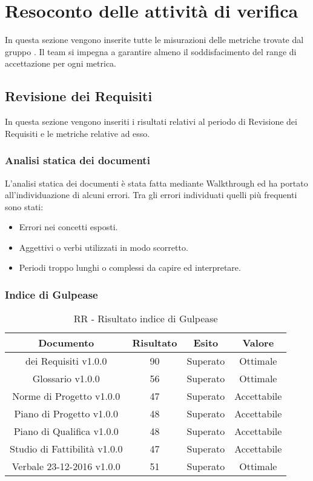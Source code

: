\section{Resoconto delle attività di verifica}

In questa sezione vengono inserite tutte le misurazioni delle metriche trovate dal gruppo \gruppo.
Il team si impegna a garantire almeno il soddisfacimento del range di accettazione per ogni metrica.


\subsection{Revisione dei Requisiti}
In questa sezione vengono inseriti i risultati relativi al periodo di Revisione dei Requisiti e le metriche relative ad esso.

\subsubsection{Analisi statica dei documenti}
L'analisi statica dei documenti è stata fatta mediante Walkthrough ed ha portato all'individuazione di alcuni errori. Tra gli errori individuati quelli più frequenti sono stati:
		\begin{itemize}
			\item Errori nei concetti esposti.
			\item Aggettivi o verbi utilizzati in modo scorretto.
			\item Periodi troppo lunghi o complessi da capire ed interpretare.
		\end{itemize}
		
\subsubsection{Indice di Gulpease}

\begin{table}[h]
	\begin{center}
		\begin{tabular}{|c|c|c|c|}
			\hline
			\textbf{Documento}	& \textbf{Risultato} & \textbf{Esito} & \textbf{Valore} \\
			\hline
		 \termine{Analisi} dei Requisiti v1.0.0 & 90 & Superato & Ottimale	\\
			\hline
			Glossario v1.0.0 & 56 & Superato & Ottimale	\\
			\hline
			Norme di Progetto v1.0.0 & 47 & Superato & Accettabile \\
			\hline
			Piano di Progetto v1.0.0 & 48 & Superato & Accettabile\\
			\hline
			Piano di Qualifica v1.0.0	& 48 & Superato & Accettabile\\
			\hline
			Studio di Fattibilità v1.0.0	& 47 & Superato & Accettabile\\
			\hline
			Verbale 23-12-2016 v1.0.0	& 51 & Superato & Ottimale	\\
			\hline
		\end{tabular}
	\end{center}
	\caption{RR - Risultato indice di Gulpease}
\end{table}



